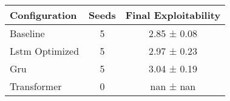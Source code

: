 \begin{tabular}{lcc}
\toprule
Configuration & Seeds & Final Exploitability \\
\midrule
Baseline & 5 & 2.85 ± 0.08 \\
Lstm Optimized & 5 & 2.97 ± 0.23 \\
Gru & 5 & 3.04 ± 0.19 \\
Transformer & 0 & nan ± nan \\
\bottomrule
\end{tabular}
